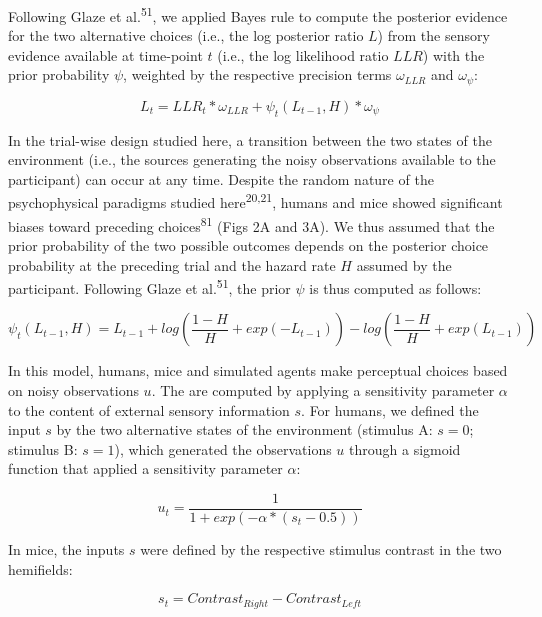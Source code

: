 \documentclass[
]{article}
\begin{document}
Following Glaze et al.\textsuperscript{51}, we applied Bayes rule to
compute the posterior evidence for the two alternative choices (i.e.,
the log posterior ratio \(L\)) from the sensory evidence available at
time-point \(t\) (i.e., the log likelihood ratio \(LLR\)) with the prior
probability \(\psi\), weighted by the respective precision terms
\(\omega_{LLR}\) and \(\omega_{\psi}\):

\begin{equation}
L_t = LLR_t * \omega_{LLR} + \psi_t(L_{t-1}, H) * \omega_{\psi}
\end{equation}

In the trial-wise design studied here, a transition between the two
states of the environment (i.e., the sources generating the noisy
observations available to the participant) can occur at any time.
Despite the random nature of the psychophysical paradigms studied
here\textsuperscript{20,21}, humans and mice showed significant biases
toward preceding choices\textsuperscript{81} (Figs 2A and 3A). We thus assumed that the
prior probability of the two possible outcomes depends on the posterior
choice probability at the preceding trial and the hazard rate \(H\)
assumed by the participant. Following Glaze et al.\textsuperscript{51},
the prior \(\psi\) is thus computed as follows:

\begin{equation}
\psi_t(L_{t-1}, H)  = L_{t-1} + log(\frac{1-H}{H} + exp(-L_{t-1})) - log(\frac{1-H}{H} + exp(L_{t-1}))
\end{equation}

In this model, humans, mice and simulated agents make perceptual choices
based on noisy observations \(u\). The are computed by applying a
sensitivity parameter \(\alpha\) to the content of external sensory
information \(s\). For humans, we defined the input \(s\) by the two
alternative states of the environment (stimulus A: \(s = 0\); stimulus
B: \(s = 1\)), which generated the observations \(u\) through a sigmoid
function that applied a sensitivity parameter \(\alpha\):

\begin{equation}
u_t = \frac{1}{1+exp(-\alpha*(s_t-0.5))}
\end{equation}

In mice, the inputs \(s\) were defined by the respective stimulus
contrast in the two hemifields:

\begin{equation}
s_t = Contrast_{Right} - Contrast_{Left}
\end{equation}
\end{document}
